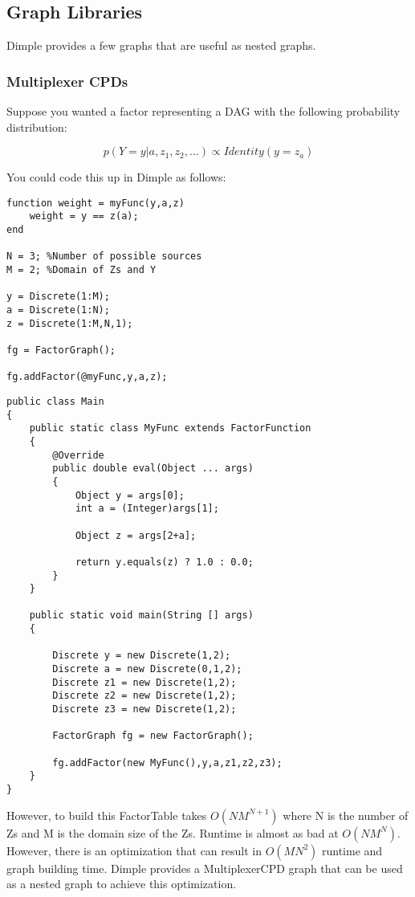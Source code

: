 \subsection{Graph Libraries}

Dimple provides a few graphs that are useful as nested graphs.

\subsubsection{Multiplexer CPDs}
\label{sec:multiplexerCPD}

Suppose you wanted a factor representing a DAG with the following probability distribution:

\[
p(Y=y|a,z_1,z_2,...) \propto Identity(y = z_a)
\]

You could code this up in Dimple as follows:

\ifmatlab
\begin{lstlisting}
function weight = myFunc(y,a,z)
    weight = y == z(a);
end

N = 3; %Number of possible sources
M = 2; %Domain of Zs and Y

y = Discrete(1:M);
a = Discrete(1:N);
z = Discrete(1:M,N,1);
 
fg = FactorGraph();
 
fg.addFactor(@myFunc,y,a,z);
\end{lstlisting}
\fi

\ifjava
\begin{lstlisting}
public class Main 
{		
	public static class MyFunc extends FactorFunction
	{
		@Override
		public double eval(Object ... args)
		{
			Object y = args[0];
			int a = (Integer)args[1];
			
			Object z = args[2+a];
			
			return y.equals(z) ? 1.0 : 0.0;
		}
	}
	
	public static void main(String [] args)
	{
		
		Discrete y = new Discrete(1,2);
		Discrete a = new Discrete(0,1,2);
		Discrete z1 = new Discrete(1,2);
		Discrete z2 = new Discrete(1,2);
		Discrete z3 = new Discrete(1,2);
		 
		FactorGraph fg = new FactorGraph();
		 
		fg.addFactor(new MyFunc(),y,a,z1,z2,z3);
	}
}
\end{lstlisting}
\fi

However, to build this FactorTable takes $O(NM^{N+1})$ where N is the number of Zs and M is the domain size of the Zs.  Runtime is almost as bad at $O(NM^N)$.  However, there is an optimization that can result in $O(MN^2)$ runtime and graph building time.  Dimple provides a MultiplexerCPD graph that can be used as a nested graph to achieve this optimization.

